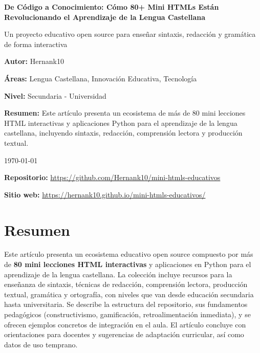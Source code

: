 \documentclass[12pt,spanish]{article}
\newcommand{\autor}{Hernank10}
\newcommand{\titulo}{De Código a Conocimiento: Cómo 80+ Mini HTMLs Están Revolucionando el Aprendizaje de la Lengua Castellana}
\begin{document}
\begin{titlepage}
    \centering
    \vspace*{2cm}
    {\Huge \textbf{\titulo} \par}
    \vspace{0.5cm}
    {\Large \textcolor{color1}{Un proyecto educativo open source para enseñar sintaxis, redacción y gramática de forma interactiva} \par}
    \vspace{1.5cm}
    {\large \textbf{Autor:} \autor \par}
    \vspace{0.5cm}
    {\large \textbf{Áreas:} Lengua Castellana, Innovación Educativa, Tecnología \par}
    \vspace{0.5cm}
    {\large \textbf{Nivel:} Secundaria - Universidad \par}
    \vspace{2cm}
    {\large \textbf{Resumen:} Este artículo presenta un ecosistema de más de 80 mini lecciones HTML interactivas y aplicaciones Python para el aprendizaje de la lengua castellana, incluyendo sintaxis, redacción, comprensión lectora y producción textual. \par}
    \vspace{2cm}
    {\large \today \par}
    \vfill
    {\large \textbf{Repositorio:} \url{https://github.com/Hernank10/mini-htmls-educativos} \par}
    \vspace{0.3cm}
    {\large \textbf{Sitio web:} \url{https://hernank10.github.io/mini-htmls-educativos/} \par}
\end{titlepage}

\section*{Resumen}

Este artículo presenta un ecosistema educativo open source compuesto por más de \textbf{80 mini lecciones HTML interactivas} y aplicaciones en Python para el aprendizaje de la lengua castellana. La colección incluye recursos para la enseñanza de sintaxis, técnicas de redacción, comprensión lectora, producción textual, gramática y ortografía, con niveles que van desde educación secundaria hasta universitaria. Se describe la estructura del repositorio, sus fundamentos pedagógicos (constructivismo, gamificación, retroalimentación inmediata), y se ofrecen ejemplos concretos de integración en el aula. El artículo concluye con orientaciones para docentes y sugerencias de adaptación curricular, así como datos de uso temprano.
\end{document}
